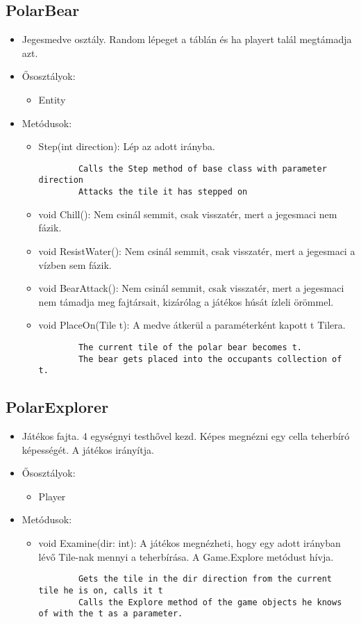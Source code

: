 \subsection{PolarBear}
\begin{itemize}
	\item Jegesmedve osztály. Random lépeget a táblán és ha playert talál megtámadja azt.
	\item Ősosztályok:
	\begin{itemize}
		\item Entity
	\end{itemize}
	\item Metódusok:
	\begin{itemize}
		\item Step(int direction): Lép az adott irányba.
		\begin{lstlisting}
		Calls the Step method of base class with parameter direction
		Attacks the tile it has stepped on
		\end{lstlisting}
		\item void Chill(): Nem csinál semmit, csak visszatér, mert a jegesmaci nem fázik.
		\item void ResistWater(): Nem csinál semmit, csak visszatér, mert a jegesmaci a vízben sem fázik.
		\item void BearAttack(): Nem csinál semmit, csak visszatér, mert a jegesmaci nem támadja meg fajtársait, kizárólag a játékos húsát ízleli örömmel.
		\item void PlaceOn(Tile t): A medve átkerül a paraméterként kapott t Tilera.
		\begin{lstlisting}
		The current tile of the polar bear becomes t.
		The bear gets placed into the occupants collection of t.
		\end{lstlisting}
	\end{itemize}
\end{itemize}

\subsection{PolarExplorer}
\begin{itemize}
	\item Játékos fajta. 4 egységnyi testhővel kezd. Képes megnézni egy cella teherbíró képességét. A játékos irányítja.
	\item Ősosztályok:
	\begin{itemize}
		\item Player
	\end{itemize}
	\item Metódusok:
	\begin{itemize}
		\item void Examine(dir: int): A játékos megnézheti, hogy egy adott irányban lévő Tile-nak mennyi a teherbírása. A Game.Explore metódust hívja.
		\begin{lstlisting}
		Gets the tile in the dir direction from the current tile he is on, calls it t
		Calls the Explore method of the game objects he knows of with the t as a parameter.
		\end{lstlisting}
	\end{itemize}
\end{itemize}

